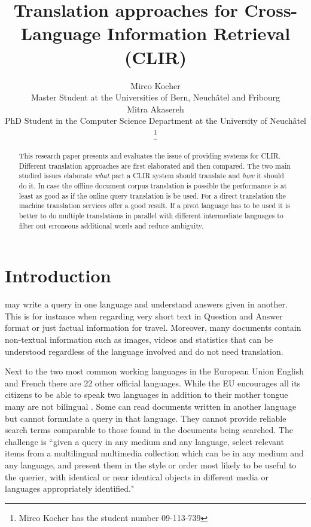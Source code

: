 \documentclass[journal]{IEEEtran}
\begin{document}
\title{Translation approaches for Cross-Language Information Retrieval (CLIR)}

\author{Mirco Kocher\\
Master Student at the Universities of Bern, Neuch\^{a}tel and Fribourg\\
Mitra Akasereh\\
PhD Student in the Computer Science Department at the University of Neuch\^{a}tel
\thanks{Mirco Kocher has the student number 09-113-739} %
}


\maketitle



\begin{abstract}
This research paper presents and evaluates the issue of providing systems for CLIR.
Different translation approaches are first elaborated and then compared.
The two main studied issues elaborate \textit{what} part a CLIR system should translate and \textit{how} it should do it.
In case the offline document corpus translation is possible the performance is at least as good as if the online query translation is be used.
For a direct translation the machine translation services offer a good result.
If a pivot language has to be used it is better to do multiple translations in parallel with different intermediate languages to filter out erroneous additional words and reduce ambiguity.
\end{abstract}



\section{Introduction}
 may write a query in one language and understand answers given in another.
This is for instance when regarding very short text in Question and Answer format or just factual information for travel.
Moreover, many documents contain non-textual information such as images, videos and statistics that can be understood regardless of the language involved and do not need translation.

Next to the two most common working languages in the European Union English and French there are 22 other official languages.
While the EU encourages all its citizens to be able to speak two languages in addition to their mother tongue many are not bilingual \cite{ebs386}.
Some can read documents written in another language but cannot formulate a query in that language.
They cannot provide reliable search terms comparable to those found in the documents being searched.
The challenge is ``given a query in any medium and any language, select relevant items from a multilingual multimedia collection which can be in any medium and any language, and present them in the style or order most likely to be useful to the querier, with identical or near identical objects in different media or languages appropriately identified." \cite{oard97a}
\end{document}

